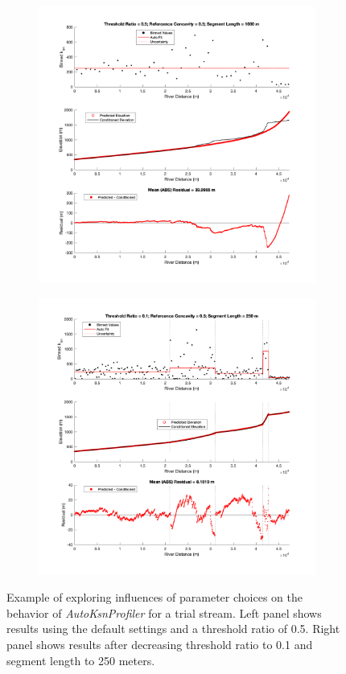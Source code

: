 \begin{figure}[H]
	\centering
	\begin{subfigure}{.5\textwidth}
		\centering
		\includegraphics[width=\linewidth]{PNGs/AutoKsn_05thresh.png}
		\label{fig:ATSsub1}
	\end{subfigure}%
	\begin{subfigure}{.5\textwidth}
		\centering
		\includegraphics[width=\linewidth]{PNGs/AutoKsn_01thresh.png}
		\label{fig:ATSsub2}
	\end{subfigure}
	\caption{Example of exploring influences of parameter choices on the behavior of \textit{AutoKsnProfiler} for a trial stream. Left panel shows results using the default settings and a threshold ratio of 0.5. Right panel shows results after decreasing threshold ratio to 0.1 and segment length to 250 meters.}
	\label{fig:AutoThreshSelect}
\end{figure}

